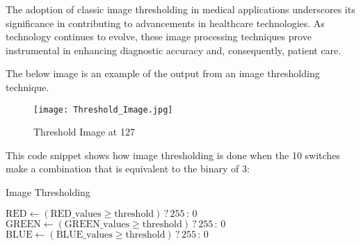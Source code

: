 \par The adoption of classic image thresholding in medical applications underscores its significance in contributing to advancements in healthcare technologies. As technology continues to evolve, these image processing techniques prove instrumental in enhancing diagnostic accuracy and, consequently, patient care. \newline
\par The below image is an example of the output from an image thresholding technique. \newline
\begin{figure}[H]
	\centering
	\texttt{[image: Threshold\_Image.jpg]}
	\caption{Threshold Image at 127}
	\label{fig:imageThreshold}  
\end{figure}
\par This code snippet shows how image thresholding is done when the 10 switches make a combination that is equivalent to the binary of 3: \newline
\begin{algorithm}[H]
	\caption{Image Thresholding \cite{fpgaipvgarepo}}
	\begin{algorithmic}[1]
		\State {}
		\State $\text{RED} \gets (\text{RED\_values} \geq \text{threshold}) \, ? \, 255 \, : \, 0$
		\State $\text{GREEN} \gets (\text{GREEN\_values} \geq \text{threshold}) \, ? \, 255 \, : \, 0$
		\State $\text{BLUE} \gets (\text{BLUE\_values} \geq \text{threshold}) \, ? \, 255 \, : \, 0$
		\EndIf
	\end{algorithmic}
\end{algorithm}

